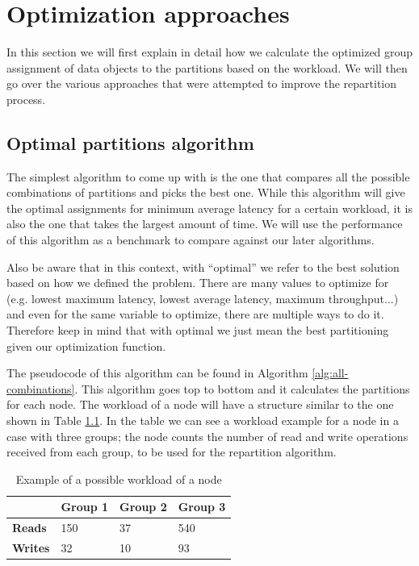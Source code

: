 \chapter{Optimization approaches}\label{sec:optimization-approaches}
In this section we will first explain in detail how we calculate the optimized group assignment of data objects to the partitions based on the workload. We will then go over the various approaches that were attempted to improve the repartition process. 

\section{Optimal partitions algorithm}\label{sec:optimal-partitions-algorithm} 
The simplest algorithm to come up with is the one that compares all the possible combinations of partitions and picks the best one. While this algorithm will give the optimal assignments for minimum average latency for a certain workload, it is also the one that takes the largest amount of time. We will use the performance of this algorithm as a benchmark to compare against our later algorithms.

Also be aware that in this context, with ``optimal'' we refer to the best solution based on how we defined the problem. There are many values to optimize for (e.g. lowest maximum latency, lowest average latency, maximum throughput...) and even for the same variable to optimize, there are multiple ways to do it. Therefore keep in mind that with optimal we just mean the best partitioning given our optimization function.

The pseudocode of this algorithm can be found in Algorithm \ref{alg:all-combinations}. This algorithm goes top to bottom and it calculates the partitions for each node. The workload of a node will have a structure similar to the one shown in Table \ref{tab:workload-example}. In the table we can see a workload example for a node in a case with three groups; the node counts the number of read and write operations received from each group, to be used for the repartition algorithm.

\begin{table}[!htb]
  \centering
  \begin{tabular}{l l l l}
    \hline
    & \textbf{Group 1} & \textbf{Group 2} & \textbf{Group 3} \\
    \hline
    \textbf{Reads} & 150 & 37 & 540 \\
    \textbf{Writes} & 32 & 10 & 93 \\
    \hline
  \end{tabular}
  \caption{Example of a possible workload of a node}\label{tab:workload-example}
\end{table}

